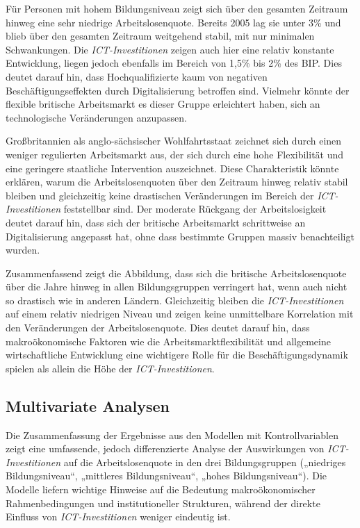 Für Personen mit hohem Bildungsniveau zeigt sich über den gesamten Zeitraum hinweg eine 
sehr niedrige Arbeitslosenquote. Bereits 2005 lag sie unter 3\% und blieb über den 
gesamten Zeitraum weitgehend stabil, mit nur minimalen Schwankungen. Die 
\textit{\ac{ICT}-Investitionen} zeigen auch hier eine relativ konstante Entwicklung, 
liegen jedoch ebenfalls im Bereich von 1,5\% bis 2\% des BIP. Dies deutet darauf hin, 
dass Hochqualifizierte kaum von negativen Beschäftigungseffekten durch Digitalisierung 
betroffen sind. Vielmehr könnte der flexible britische Arbeitsmarkt es dieser Gruppe 
erleichtert haben, sich an technologische Veränderungen anzupassen.

Großbritannien als anglo-sächsischer Wohlfahrtsstaat zeichnet sich durch einen 
weniger regulierten Arbeitsmarkt aus, der sich durch eine hohe Flexibilität und eine 
geringere staatliche Intervention auszeichnet. Diese Charakteristik könnte erklären, 
warum die Arbeitslosenquoten über den Zeitraum hinweg relativ stabil bleiben und 
gleichzeitig keine drastischen Veränderungen im Bereich der \textit{\ac{ICT}-Investitionen} 
feststellbar sind. Der moderate Rückgang der Arbeitslosigkeit deutet darauf hin, dass sich 
der britische Arbeitsmarkt schrittweise an Digitalisierung angepasst hat, ohne dass 
bestimmte Gruppen massiv benachteiligt wurden.

Zusammenfassend zeigt die Abbildung, dass sich die britische Arbeitslosenquote über die 
Jahre hinweg in allen Bildungsgruppen verringert hat, wenn auch nicht so drastisch wie in 
anderen Ländern. Gleichzeitig bleiben die \textit{\ac{ICT}-Investitionen} auf einem 
relativ niedrigen Niveau und zeigen keine unmittelbare Korrelation mit den Veränderungen 
der Arbeitslosenquote. Dies deutet darauf hin, dass makroökonomische Faktoren wie die 
Arbeitsmarktflexibilität und allgemeine wirtschaftliche Entwicklung eine wichtigere Rolle 
für die Beschäftigungsdynamik spielen als allein die Höhe der \textit{\ac{ICT}-Investitionen}.



\subsection{Multivariate Analysen}

Die Zusammenfassung der Ergebnisse aus den Modellen mit Kontrollvariablen zeigt eine 
umfassende, jedoch differenzierte Analyse der Auswirkungen von 
\textit{\ac{ICT}-Investitionen} auf die Arbeitslosenquote in den drei Bildungsgruppen 
(„niedriges Bildungsniveau“, „mittleres Bildungsniveau“, „hohes Bildungsniveau“). Die 
Modelle liefern wichtige Hinweise auf die Bedeutung makroökonomischer Rahmenbedingungen 
und institutioneller Strukturen, während der direkte Einfluss von 
\textit{\ac{ICT}-Investitionen} weniger eindeutig ist.

